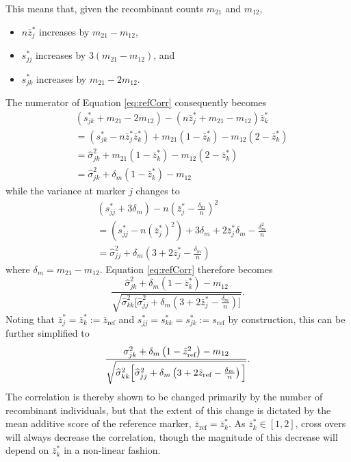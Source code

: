 \documentclass[sts]{imsart}
\begin{document}
This means that, given the recombinant counts $m_{21}$ and $m_{12}$,
\begin{itemize}
\item $n \bar{z}_{j}^*$ increases by $m_{21} - m_{12}$,
\item $s_{jj}^*$ increases by $3 ( m_{21} - m_{12} )$, and
\item $s_{jk}^*$ increases by $m_{21} - 2 m_{12}$.
\end{itemize}
The numerator of Equation \ref{eq:refCorr} consequently becomes
\begin{eqnarray}
  & \left ( s^*_{jk} + m_{21} - 2 m_{12} \right ) - \left( n \bar{z}_{j}^* + m_{21} - m_{12} \right ) \bar{z}_{k}^* \nonumber\\
  & = \left ( s^*_{jk} - n \bar{z}_{j}^* \bar{z}_{k}^* \right ) + m_{21}(1 - \bar{z}_k^*) - m_{12} (2 - \bar{z}_{k}^*) \nonumber\\
  & = \widehat{\sigma}_{jk}^2 + m_{21} (1 - \bar{z}_k^*) - m_{12}( 2 -  \bar{z}_{k}^*) \nonumber \\
  & = \widehat{\sigma}_{jk}^2 + \delta_m (1 - \bar{z}_k^* ) - m_{12}     
\end{eqnarray}
while the variance at marker $j$ changes to
\begin{eqnarray}
  & \left ( s_{jj}^* + 3\delta_m \right ) -  n \left ( \bar{z}_{j}^* - \frac{\delta_m}{n} \right )^2 \nonumber \\
  & = \left ( s_{jj}^* - n (\bar{z}_{j}^*)^2 \right ) + 3 \delta_m + 2 \bar{z}_{j}^* \delta_m -  \frac{\delta_m^2}{n} \nonumber \\
  & = \widehat{\sigma}_{jj}^2 + \delta_m \left ( 3 + 2 \bar{z}_j^* - \frac{\delta_m}{n} \right )
\end{eqnarray}
where $\delta_m = m_{21} - m_{12}$. Equation \ref{eq:refCorr} therefore becomes
\begin{equation}
  \frac{\widehat{\sigma}_{jk}^2 + \delta_m (1 - \bar{z}_k^* ) - m_{12}}{\sqrt{ \widehat{\sigma}_{kk}^2 \Big [ \widehat{\sigma}_{jj}^2 + \delta_m \left ( 3 + 2 \bar{z}_j^* - \frac{\delta_m}{n} \right ) \Big ]}}.
\end{equation}
Noting that $\bar{z}_j^* = \bar{z}_k^* := \bar{z}_{\text{ref}}$ and $s_{jj}^* = s_{kk}^* = s_{jk}^* := s_{\text{ref}}$ by construction, this can be further simplified to
\begin{equation} \label{eq:crossedCorr}
  \frac{ \sigma_{jk}^2 + \delta_m \left(1 - \bar{z}_{\text{ref}}^2 \right ) - m_{12}}{\sqrt{ \widehat{\sigma}_{kk}^2 \Big [ \widehat{\sigma}_{jj}^2 + \delta_m \left ( 3 + 2 \bar{z}_{\text{ref}} - \frac{\delta_m}{n} \right ) \Big ] }}. \\
\end{equation}
The correlation is thereby shown to be changed primarily by the number of recombinant individuals, but that the extent of this change is dictated by the mean additive score of the reference marker, $\bar{z}_{\text{ref}} = \bar{z}_k^*$. As $\bar{z}_k^* \in [1, 2]$, cross overs will always decrease the correlation, though the magnitude of this decrease will depend on $\bar{z}_k^*$ in a non-linear fashion.
\end{document}
